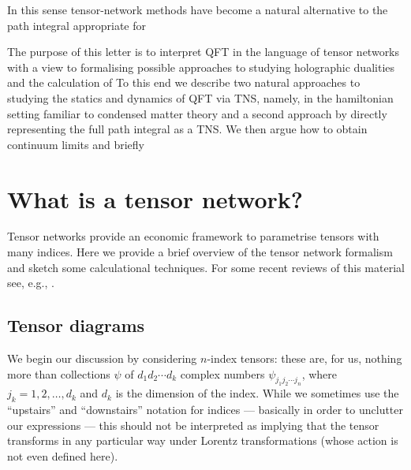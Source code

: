 \documentclass[twocolumn,lengthcheck,superscriptaddress]{revtex4-1}
\theoremstyle{definition}
\theoremstyle{remark}
\begin{document}
In this sense tensor-network methods have become a natural alternative to the path integral appropriate for 

The purpose of this letter is to interpret QFT in the language of tensor networks with a view to formalising possible approaches to studying holographic dualities and the calculation of  To this end we describe two natural approaches to studying the statics and dynamics of QFT via TNS, namely, in the hamiltonian setting familiar to condensed matter theory and a second approach by directly representing the full path integral as a TNS. We then argue how to obtain continuum limits and briefly 

\section{What is a tensor network?}

Tensor networks provide an economic framework to parametrise tensors with many indices. Here we provide a brief overview of the tensor network formalism and sketch some calculational techniques. For some recent reviews of this material see, e.g., \cite{orus:2013a, evenbly:2011a, evenbly:2009a}.

\subsection{Tensor diagrams}

We begin our discussion by considering $n$-index tensors: these are, for us, nothing more than collections $\psi$ of $d_1d_2\cdots d_k$ complex numbers $\psi_{j_1j_2\cdots j_n}$, where $j_k = 1, 2, \ldots, d_k$ and  $d_k$ is the dimension of the index. While we sometimes use the ``upstairs'' and ``downstairs'' notation for indices --- basically in order to unclutter our expressions --- this should not be interpreted as implying that the tensor transforms in any particular way under Lorentz transformations (whose action is not even defined here).
\end{document}
